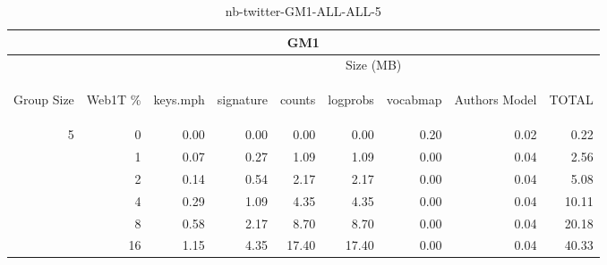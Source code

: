 \begin{center}
\begin{table}[htbp] 
 \begin{center}
\begin{tabular}{ | r | r | r | r | r | r | r | r | r |}
\hline
\multicolumn{9}{|c|}{GM1}\\
\hline
 & & \multicolumn{7}{|c|}{Size (MB)}\\ \cline{3-9}
\begin{sideways}Group Size\end{sideways} & \begin{sideways}Web1T \% \end{sideways} & \begin{sideways}keys.mph\end{sideways} & \begin{sideways}signature\end{sideways} & \begin{sideways}counts\end{sideways} & \begin{sideways}logprobs\end{sideways} & \begin{sideways}vocabmap\end{sideways} & \begin{sideways}Authors Model \end{sideways} & \begin{sideways}TOTAL\end{sideways}\\
\hline
\multirow{5}{*}{5}
 & 0 & 0.00 & 0.00 & 0.00 & 0.00 & 0.20 & 0.02 & 0.22\\ \cline{2-9}
 & 1 & 0.07 & 0.27 & 1.09 & 1.09 & 0.00 & 0.04 & 2.56\\ \cline{2-9}
 & 2 & 0.14 & 0.54 & 2.17 & 2.17 & 0.00 & 0.04 & 5.08\\ \cline{2-9}
 & 4 & 0.29 & 1.09 & 4.35 & 4.35 & 0.00 & 0.04 & 10.11\\ \cline{2-9}
 & 8 & 0.58 & 2.17 & 8.70 & 8.70 & 0.00 & 0.04 & 20.18\\ \cline{2-9}
 & 16 & 1.15 & 4.35 & 17.40 & 17.40 & 0.00 & 0.04 & 40.33\\ \cline{2-9}
\hline
\end{tabular}
\caption{nb-twitter-GM1-ALL-ALL-5}
\label{table:nb-twitter-GM1-ALL-ALL-5}
\end{center}
 \end{table}
\end{center}

